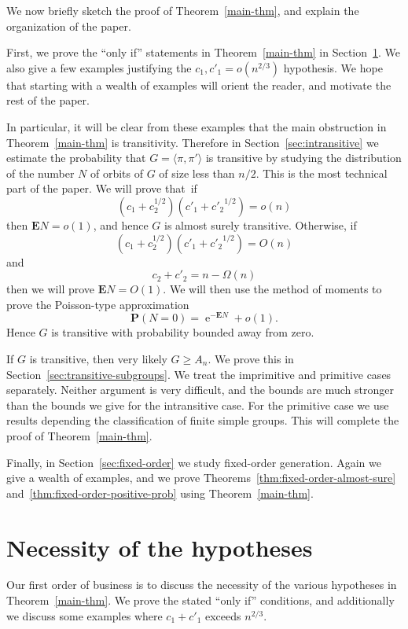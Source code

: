\documentclass[ALCO,ThmDefs,Unicode,epreuves]{cedram}
\DeclareMathOperator{\expe}{e}
\renewcommand\P{\mathbf{P}}
\newcommand\E{\mathbf{E}}
\begin{document}
We now briefly sketch the proof of Theorem~\ref{main-thm}, and explain the organization of the paper.

First, we prove the ``only if'' statements in Theorem~\ref{main-thm} in Section~\ref{sec:converses}. We also give a few examples justifying the $c_1, c'_1 = o(n^{2/3})$ hypothesis. We hope that starting with a wealth of examples will orient the reader, and motivate the rest of the paper.

In particular, it will be clear from these examples that the main obstruction in Theorem~\ref{main-thm} is transitivity. Therefore in Section~\ref{sec:intransitive} we estimate the probability that $G = \langle \pi, \pi'\rangle$ is transitive by studying the distribution of the number $N$ of orbits of $G$ of size less than $n/2$. This is the most technical part of the paper. We will prove that~if
\[
 (c_1 + c_2^{1/2}) (c'_1 + {c'_2}^{1/2}) = o(n)
\]
then $\E N = o(1)$, and hence $G$ is almost surely transitive. Otherwise, if
\[
 (c_1 + c_2^{1/2}) (c'_1 + {c'_2}^{1/2}) = O(n)
\]
and
\[
 c_2 + c'_2 = n - \Omega(n)
\]
then we will prove $\E N = O(1)$. We will then use the method of moments to prove the Poisson-type approximation
\[
 \P(N = 0) = \expe^{-\E N} + o(1).
\]
Hence $G$ is transitive with probability bounded away from zero.

If $G$ is transitive, then very likely $G \geq A_n$. We prove this in Section~\ref{sec:transitive-subgroups}. We treat the imprimitive and primitive cases separately. Neither argument is very difficult, and the bounds are much stronger than the bounds we give for the intransitive case. For the primitive case we use results depending the classification of finite simple groups. This will complete the proof of Theorem~\ref{main-thm}.

Finally, in Section~\ref{sec:fixed-order} we study fixed-order generation. Again we give a wealth of examples, and we prove Theorems~\ref{thm:fixed-order-almost-sure} and~\ref{thm:fixed-order-positive-prob} using Theorem~\ref{main-thm}.

\section{Necessity of the hypotheses} \label{sec:converses}

Our first order of business is to discuss the necessity of the various hypotheses in Theorem~\ref{main-thm}. We prove the stated ``only if'' conditions, and additionally we discuss some examples where $c_1 + c'_1$ exceeds $n^{2/3}$.
\end{document}
